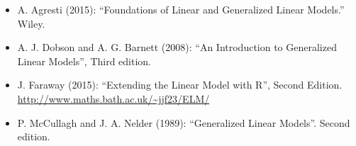 \documentclass[
]{article}
\providecommand{\tightlist}{%
  \setlength{\itemsep}{0pt}\setlength{\parskip}{0pt}}
\begin{document}
\begin{itemize}
\tightlist
\item
  A. Agresti (2015): ``Foundations of Linear and Generalized Linear
  Models.'' Wiley.
\item
  A. J. Dobson and A. G. Barnett (2008): ``An Introduction to
  Generalized Linear Models'', Third edition.
\item
  J. Faraway (2015): ``Extending the Linear Model with R'', Second
  Edition. \url{http://www.maths.bath.ac.uk/~jjf23/ELM/}
\item
  P. McCullagh and J. A. Nelder (1989): ``Generalized Linear Models''.
  Second edition.
\end{itemize}
\end{document}
